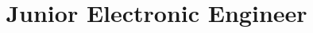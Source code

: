 \documentclass[10pt,a4paper,sans]{moderncv}
\title{Junior Electronic Engineer}
\begin{document}
\makecvtitle









\pagebreak






\end{document}
